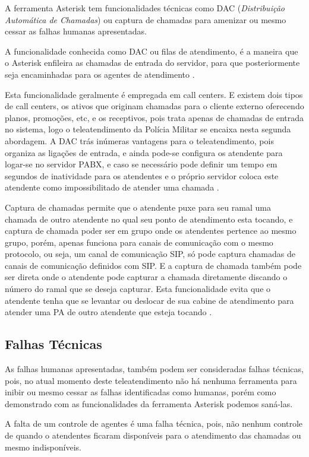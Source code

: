 A ferramenta Asterisk tem funcionalidades técnicas como DAC (\textit{Distribuição Automática de Chamadas}) ou captura de chamadas para amenizar ou mesmo cessar as falhas humanas apresentadas.

A funcionalidade conhecida como DAC ou filas de atendimento, é a maneira que o Asterisk enfileira as chamadas de entrada do servidor, para que posteriormente seja encaminhadas para os agentes de atendimento \cite{flavioeduardoandredade2005}.

Esta funcionalidade geralmente é empregada em call centers. E existem dois tipos de call centers, os ativos que originam chamadas para o cliente externo oferecendo planos, promoções, etc, e os receptivos, pois trata apenas de chamadas de entrada no sistema, logo o teleatendimento da Polícia Militar se encaixa nesta segunda abordagem. A DAC trás inúmeras vantagens para o teleatendimento, pois organiza as ligações de entrada, e ainda pode-se configura os atendente para logar-se no servidor PABX, e caso se necessário pode definir um tempo em segundos de inatividade para os atendentes e o próprio servidor coloca este atendente como impossibilitado de atender uma chamada \cite{alexandrekeller2014}.

Captura de chamadas permite que o atendente puxe para seu ramal uma chamada de outro atendente no qual seu ponto de atendimento esta tocando, e captura de chamada poder ser em grupo onde os atendentes pertence ao mesmo grupo, porém, apenas funciona para canais de comunicação com o mesmo protocolo, ou seja, um canal de comunicação SIP, só pode captura chamadas de canais de comunicação definidos com SIP. E a captura de chamada também pode ser direta onde o atendente pode capturar a chamada diretamente discando o número do ramal que se deseja capturar. Esta funcionalidade evita que o atendente tenha que se levantar ou deslocar de sua cabine de atendimento para atender uma PA de outro atendente que esteja tocando \cite{alexandrekeller2014}. 

\subsection{Falhas Técnicas}
As falhas humanas apresentadas, também podem ser consideradas falhas técnicas, pois, no atual momento deste teleatendimento não há nenhuma ferramenta para inibir ou mesmo cessar as falhas identificadas como humanas, porém como demonstrado com as funcionalidades da ferramenta Asterisk podemos saná-las.

A falta de um controle de agentes é uma falha técnica, pois, não nenhum controle de quando o atendentes ficaram disponíveis para o atendimento das chamadas ou mesmo indisponíveis.

